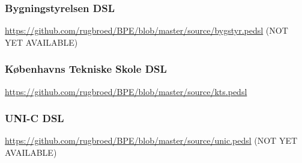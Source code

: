 \documentclass{llncs}
\begin{document}
\subsubsection{Bygningstyrelsen DSL}\label{sec:dsl-bygstyr}
\url{https://github.com/rugbroed/BPE/blob/master/source/bygstyr.pedsl} (NOT YET AVAILABLE)

\subsubsection{K\o benhavns Tekniske Skole DSL}\label{sec:dsl-kts}
\url{https://github.com/rugbroed/BPE/blob/master/source/kts.pedsl}


\subsubsection{UNI-C DSL}\label{sec:dsl-uni-c}
\url{https://github.com/rugbroed/BPE/blob/master/source/unic.pedsl} (NOT YET AVAILABLE)
\end{document}
